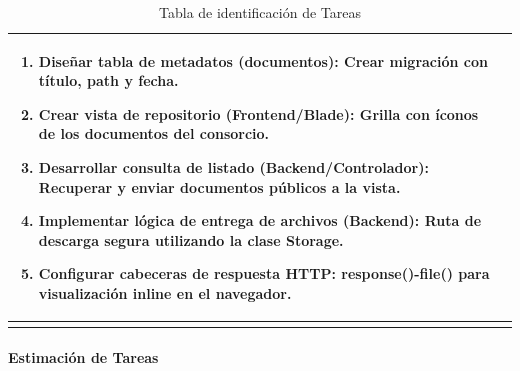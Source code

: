 \begin{longtable}{|p{4.5cm}|p{10.5cm}|}
            \begin{enumerate}[leftmargin=*,nosep]
                \item \textbf{Diseñar tabla de metadatos (documentos):} Crear migración con título, path y fecha.
                \item \textbf{Crear vista de repositorio (Frontend/Blade):} Grilla con íconos de los documentos del consorcio.
                \item \textbf{Desarrollar consulta de listado (Backend/Controlador):} Recuperar y enviar documentos públicos a la vista.
                \item \textbf{Implementar lógica de entrega de archivos (Backend):} Ruta de descarga segura utilizando la clase Storage.
                \item \textbf{Configurar cabeceras de respuesta HTTP:} response()-\>file() para visualización inline en el navegador.
            \end{enumerate} 
        
    \\ \hline

    \caption{Tabla de identificación de Tareas}
\end{longtable}

\paragraph{Estimación de Tareas}


